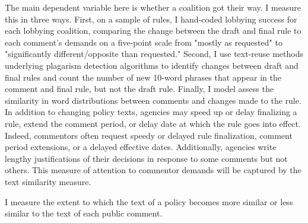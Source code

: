 

The main dependent variable here is whether a coalition got their way. I measure this in three ways. First, on a sample of rules, I hand-coded lobbying success for each lobbying coalition, comparing the change between the draft and final rule to each comment's demands on a five-point scale from "mostly as requested" to "significantly different/opposite than requested." Second, I use text-reuse methods underlying plagarism detection algorithms to identify changes between draft and final rules and count the number of new 10-word phrases that appear in the comment and final rule, but not the draft rule. Finally, I model assess the similarity in word distributions between comments and changes made to the rule.
In addition to changing policy texts, agencies may speed up or delay finalizing a rule, extend the comment period, or delay date at which the rule goes into effect. Indeed, commentors often request speedy or delayed rule finalization, comment period extensions, or a delayed effective dates. Additionally, agencies write lengthy justifications of their decisions in response to some comments but not others. This measure of attention to commentor demands will be captured by the text similarity measure. %




I measure the extent to which the text of a policy becomes more similar or less similar to the text of each public comment. 

